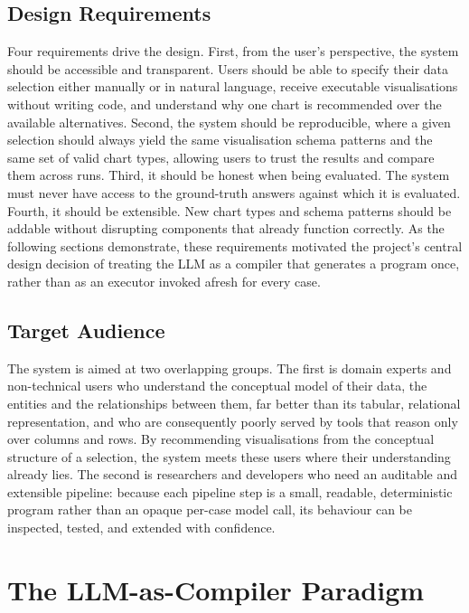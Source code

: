 \subsection{Design Requirements}
\label{sec:design-requirements}

Four requirements drive the design. First, from the user’s perspective, the system should be accessible and transparent. Users should be able to specify their data selection either manually or in natural language, receive executable visualisations without writing code, and understand why one chart is recommended over the available alternatives. Second, the system should be reproducible, where a given selection should always yield the same visualisation schema patterns and the same set of valid chart types, allowing users to trust the results and compare them across runs. Third, it should be honest when being evaluated. The system must never have access to the ground-truth answers against which it is evaluated. Fourth, it should be extensible. New chart types and schema patterns should be addable without disrupting components that already function correctly. As the following sections demonstrate, these requirements motivated the project’s central design decision of treating the LLM as a compiler that generates a program once, rather than as an executor invoked afresh for every case.

\subsection{Target Audience}
\label{sec:target-audience}

The system is aimed at two overlapping groups. The first is domain experts and non-technical users who understand the conceptual model of their data, the entities and the relationships between them, far better than its tabular, relational representation, and who are consequently poorly served by tools that reason only over columns and rows. By recommending visualisations from the conceptual structure of a selection, the system meets these users where their understanding already lies. The second is researchers and developers who need an auditable and extensible pipeline: because each pipeline step is a small, readable, deterministic program rather than an opaque per-case model call, its behaviour can be inspected, tested, and extended with confidence.

\section{The LLM-as-Compiler Paradigm}
\label{sec:llm-compiler}

